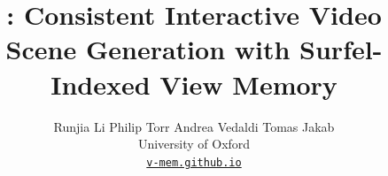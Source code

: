 %


\title{%
\mname: Consistent Interactive Video Scene Generation with Surfel-Indexed View Memory%
%
}
\author{%
Runjia Li%
\quad%
Philip Torr%
\quad%
Andrea Vedaldi%
\quad%
Tomas Jakab \\[0.4em]
University of Oxford \\[0.1em]
%
\small \href{https://v-mem.github.io}{\texttt{v-mem.github.io}}%
}
